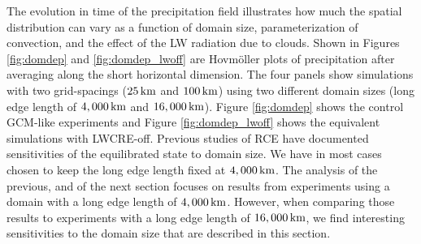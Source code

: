 \documentclass[draft]{agujournal2019}
\begin{document}
The evolution in time of the precipitation field illustrates how much the spatial distribution can vary as a 
function of domain size, parameterization of convection, and the effect of the LW radiation due to clouds. 
Shown in Figures {\ref{fig:domdep}} and {\ref{fig:domdep_lwoff}} are Hovm{\"o}ller plots of precipitation after 
averaging along the short horizontal dimension.  The four panels show simulations with two grid-spacings 
($25\, \rm{km}$ and $100\, \rm{km}$) using two different domain sizes (long edge length of $4,000\, \rm{km}$ and $16,000\, \rm{km}$).
Figure {\ref{fig:domdep}} shows the control GCM-like experiments and Figure  {\ref{fig:domdep_lwoff}} shows the equivalent simulations with LWCRE-off.    
 Previous studies of RCE
\cite{Bretherton_etal_2005, Bretherton_etal_2006, Muller2012, Jeevanjee2013, Silvers_etal_2016, Dixit_etal_2018, Patrizio_Randall_2019}
have documented sensitivities of the equilibrated state to domain size.  
We have in most cases chosen to keep the long edge length fixed at $4,000\, \rm{km}$. 
The analysis of the previous, and of the next section focuses on results from 
experiments using a domain with a long edge length of $4,000 \, \rm{km}$.  However, when comparing those results
to experiments with a long edge length of $16,000 \, \rm{km}$, we find interesting sensitivities to the domain size that are described in this section. 
\end{document}
